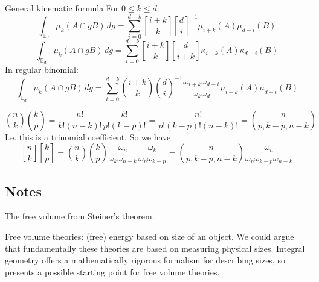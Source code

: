 \begin{theorem}{General kinematic formula}
  For $0 \le k \le d$:
  \begin{equation}
    \int_{\mathbb{E}_d} \mu_k (A \cap g B) \, dg =
    \sum_{i=0}^{d-k}
    {i + k \brack k} {d \brack i}^{-1}
    \mu_{i+k}(A) \mu_{d-i}(B)
  \end{equation}
  \begin{equation*}
    \int_{\mathbb{E}_d} \mu_k (A \cap g B) \, dg =
    \sum_{i=0}^{d-k}
    {i + k \brack k}
    {d \brack i + k}
    \kappa_{i+k}(A) \kappa_{d-i}(B)
  \end{equation*}
  In regular binomial:
  \begin{equation*}
    \int_{\mathbb{E}_d} \mu_k (A \cap g B) \, dg =
    \sum_{i=0}^{d-k}
    {i + k \choose k} {d \choose i}^{-1}
    \frac{\omega_{i+k} \omega_{d-i}}{\omega_k \omega_d}
    \mu_{i+k}(A) \mu_{d-i}(B)
  \end{equation*}
\end{theorem}

\begin{equation*}
  {n \choose k} {k \choose p}
  =
  \frac{n!}{k!(n-k)!}
  \frac{k!}{p!(k-p)!}
  =
  \frac{n!}{p!(k-p)!(n-k)!}
  =
  {n \choose p, k-p, n-k}
\end{equation*}
I.e. this is a trinomial coefficient.
So we have
\begin{equation*}
  {n \brack k} {k \brack p}
  =
  {n \choose k}
  {k \choose p}
  \frac{\omega_n}{\omega_k \omega_{n-k}}
  \frac{\omega_k}{\omega_p \omega_{k-p}}
  =
  {n \choose p, k-p, n-k}
  \frac{\omega_n}{\omega_p \omega_{k-p} \omega_{n-k}}
\end{equation*}

\subsection{Notes}

The free volume from Steiner's theorem.

Free volume theories: (free) energy based on size of an object.
We could argue that fundamentally these theories are based on measuring physical sizes.
Integral geometry offers a mathematically rigorous formalism for describing sizes, so presents a possible starting point for free volume theories.

